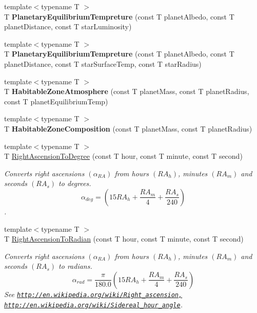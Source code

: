\begin{DoxyCompactItemize}
{\footnotesize template$<$typename T $>$ }\\T {\bfseries Planetary\+Equilibrium\+Tempreture} (const T planet\+Albedo, const T planet\+Distance, const T star\+Luminosity)
\item 
{\footnotesize template$<$typename T $>$ }\\T {\bfseries Planetary\+Equilibrium\+Tempreture} (const T planet\+Albedo, const T planet\+Distance, const T star\+Surface\+Temp, const T star\+Radius)
\item 
{\footnotesize template$<$typename T $>$ }\\T {\bfseries Habitable\+Zone\+Atmosphere} (const T planet\+Mass, const T planet\+Radius, const T planet\+Equilibrium\+Temp)
\item 
{\footnotesize template$<$typename T $>$ }\\T {\bfseries Habitable\+Zone\+Composition} (const T planet\+Mass, const T planet\+Radius)
\item 
{\footnotesize template$<$typename T $>$ }\\T \mbox{\hyperlink{group___e_g_x_phys-_astrophysics-_right_ascension_ga27ba790eb8358535613d3b32f97d9e3a}{Right\+Ascension\+To\+Degree}} (const T hour, const T minute, const T second)
\begin{DoxyCompactList}\small\item\em Converts right ascensions $(\alpha_{RA})$ from hours $(RA_h)$, minutes $(RA_m)$ and seconds $(RA_s)$ to degrees. \[\alpha_{deg}=(15 RA_h + \frac{RA_m}{4} + \frac{RA_s}{240})\]. \end{DoxyCompactList}\item 
{\footnotesize template$<$typename T $>$ }\\T \mbox{\hyperlink{group___e_g_x_phys-_astrophysics-_right_ascension_ga63a3103990c95078443e39a5b487ab0d}{Right\+Ascension\+To\+Radian}} (const T hour, const T minute, const T second)
\begin{DoxyCompactList}\small\item\em Converts right ascensions $(\alpha_{RA})$ from hours $(RA_h)$, minutes $(RA_m)$ and seconds $(RA_s)$ to radians. \[\alpha_{rad}=\frac{\pi}{180.0}(15 RA_h + \frac{RA_m}{4} + \frac{RA_s}{240})\] See \href{http://en.wikipedia.org/wiki/Right_ascension,}{\tt http\+://en.\+wikipedia.\+org/wiki/\+Right\+\_\+ascension,} \href{http://en.wikipedia.org/wiki/Sidereal_hour_angle}{\tt http\+://en.\+wikipedia.\+org/wiki/\+Sidereal\+\_\+hour\+\_\+angle}. \end{DoxyCompactList}\item 

\end{DoxyCompactItemize}
